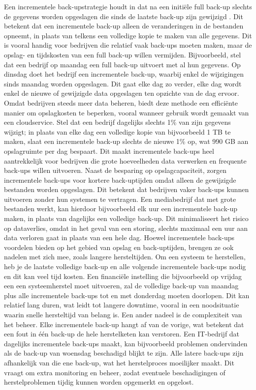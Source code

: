 Een incrementele back-upstrategie houdt in dat na een initiële full back-up slechts de gegevens worden opgeslagen die sinds de laatste back-up zijn gewijzigd \autocite{Zhao2024}. Dit betekent dat een incrementele back-up alleen de veranderingen in de bestanden opneemt, in plaats van telkens een volledige kopie te maken van alle gegevens. Dit is vooral handig voor bedrijven die relatief vaak back-ups moeten maken, maar de opslag- en tijdskosten van een full back-up willen vermijden. Bijvoorbeeld, stel dat een bedrijf op maandag een full back-up uitvoert met al hun gegevens. Op dinsdag doet het bedrijf een incrementele back-up, waarbij enkel de wijzigingen sinds maandag worden opgeslagen. Dit gaat elke dag zo verder, elke dag wordt enkel de nieuwe of gewijzigde data opgeslagen ten opzichte van de dag ervoor. Omdat bedrijven steeds meer data beheren, biedt deze methode een efficiënte manier om opslagkosten te beperken, vooral wanneer gebruik wordt gemaakt van een cloudservice. Stel dat een bedrijf dagelijks slechts 1\% van zijn gegevens wijzigt; in plaats van elke dag een volledige kopie van bijvoorbeeld 1 TB te maken, slaat een incrementele back-up slechts de nieuwe 1\% op, wat 990 GB aan opslagruimte per dag bespaart. Dit maakt incrementele back-ups heel aantrekkelijk voor bedrijven die grote hoeveelheden data verwerken en frequente back-ups willen uitvoeren. Naast de besparing op opslagcapaciteit, zorgen incrementele back-ups voor kortere back-uptijden omdat alleen de gewijzigde bestanden worden opgeslagen. Dit betekent dat bedrijven vaker back-ups kunnen uitvoeren zonder hun systemen te vertragen. Een mediabedrijf dat met grote bestanden werkt, kan hierdoor bijvoorbeeld elk uur een incrementele back-up maken, in plaats van dagelijks een volledige back-up. Dit minimaliseert het risico op dataverlies, omdat in het geval van een storing, slechts maximaal een uur aan data verloren gaat in plaats van een hele dag. Hoewel incrementele back-ups voordelen bieden op het gebied van opslag en back-uptijden, brengen ze ook nadelen met zich mee, zoals langere hersteltijden\autocite{Chervenak1998}. Om een systeem te herstellen, heb je de laatste volledige back-up en alle volgende incrementele back-ups nodig en dit kan veel tijd kosten. Een financiële instelling die bijvoorbeeld op vrijdag een een systeemherstel moet uitvoeren, zal de volledige back-up van maandag plus alle incrementele back-ups tot en met donderdag moeten doorlopen. Dit kan relatief lang duren, wat leidt tot langere downtime, vooral in een noodsituatie waarin snelle hersteltijd van belang is. Een ander nadeel is de complexiteit van het beheer. Elke incrementele back-up hangt af van de vorige, wat betekent dat een fout in één back-up de hele herstelketen kan verstoren. Een IT-bedrijf dat dagelijks incrementele back-ups maakt, kan bijvoorbeeld problemen ondervinden als de back-up van woensdag beschadigd blijkt te zijn. Alle latere back-ups zijn afhankelijk van die ene back-up, wat het herstelproces moeilijker maakt. Dit vraagt om extra monitoring en beheer, zodat eventuele beschadigingen of herstelproblemen tijdig kunnen worden opgemerkt en opgelost.
